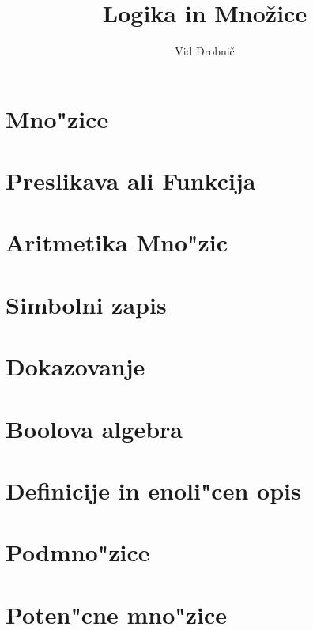 \documentclass[a4paper, 12pt]{article}
\title{Logika in Množice}
\author{Vid Drobnič}
\date{}
\begin{document}
	\maketitle
	\thispagestyle{empty}
	\pagebreak
	\setcounter{page}{1}
	
	\tableofcontents
	\pagebreak
	
	\section{Mno"zice}
	
	
	\section{Preslikava ali Funkcija}
	
	
	\section{Aritmetika Mno"zic}
	
	
	\section{Simbolni zapis}
	
	
	\section{Dokazovanje}
	
	
	\section{Boolova algebra}
	
	
	\section{Definicije in enoli"cen opis}
	
	
	\section{Podmno"zice}
	
	
	\section{Poten"cne mno"zice}
	
	
\end{document}
